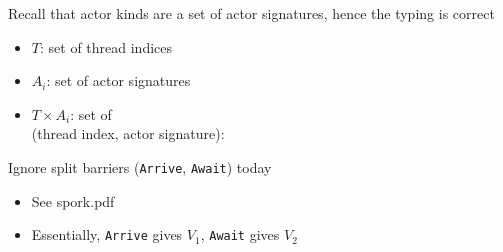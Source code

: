 \begin{minipage}[t]{0.48\textwidth}\fixminipage


Recall that actor kinds are a set of actor signatures, hence the typing is correct
\begin{itemize}
  \item $T$: set of thread indices
  \item $A_i$: set of actor signatures
  \item $T \times A_i$: set of\\(thread index, actor signature): 
\end{itemize}

\vspace{6mm}
Ignore split barriers (\texttt{Arrive}, \texttt{Await}) today
\begin{itemize}
  \item See spork.pdf
  \item Essentially, \texttt{Arrive} gives $V_1$, \texttt{Await} gives $V_2$
\end{itemize}
\end{minipage}
\newpage
